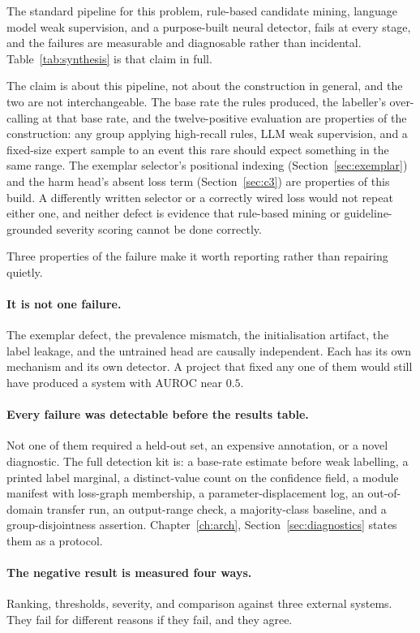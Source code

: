 The standard pipeline for this problem, rule-based candidate mining, language
model weak supervision, and a purpose-built neural detector, fails at every
stage, and the failures are measurable and diagnosable rather than incidental.
Table~\ref{tab:synthesis} is that claim in full.

The claim is about this pipeline, not about the construction in general, and
the two are not interchangeable. The base rate the rules produced, the
labeller's over-calling at that base rate, and the twelve-positive evaluation
are properties of the construction: any group applying high-recall rules,
LLM weak supervision, and a fixed-size expert sample to an event this rare
should expect something in the same range. The exemplar selector's
positional indexing (Section~\ref{sec:exemplar}) and the harm head's absent
loss term (Section~\ref{sec:c3}) are properties of this build. A
differently written selector or a correctly wired loss would not repeat
either one, and neither defect is evidence that rule-based mining or
guideline-grounded severity scoring cannot be done correctly.

Three properties of the failure make it worth reporting rather than repairing
quietly.

\paragraph{It is not one failure.} The exemplar defect, the prevalence mismatch,
the initialisation artifact, the label leakage, and the untrained head are
causally independent. Each has its own mechanism and its own detector. A project
that fixed any one of them would still have produced a system with AUROC near
$0.5$.

\paragraph{Every failure was detectable before the results table.} Not one of
them required a held-out set, an expensive annotation, or a novel diagnostic.
The full detection kit is: a base-rate estimate before weak labelling, a printed
label marginal, a distinct-value count on the confidence field, a module
manifest with loss-graph membership, a parameter-displacement log, an
out-of-domain transfer run, an output-range check, a majority-class baseline,
and a group-disjointness assertion. Chapter~\ref{ch:arch},
Section~\ref{sec:diagnostics} states them as a protocol.

\paragraph{The negative result is measured four ways.} Ranking, thresholds,
severity, and comparison against three external systems. They fail for different
reasons if they fail, and they agree.

